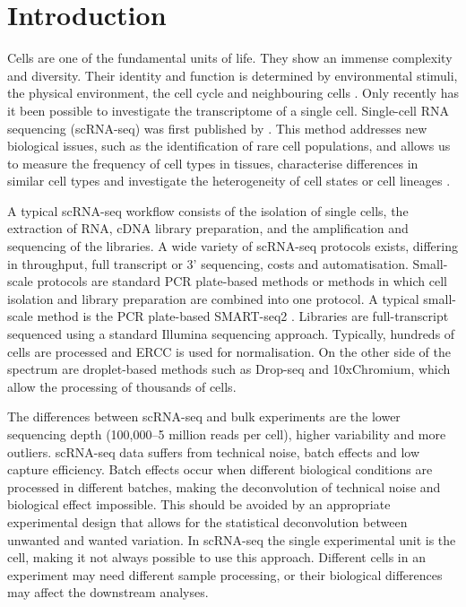 \documentclass[11pt, a4paper]{article}\usepackage[]{graphicx}\usepackage[]{color}
\begin{document}
\tableofcontents
\newpage
\section{Introduction}
Cells are one of the fundamental units of life. They show an immense complexity and diversity. Their identity and function is determined by environmental stimuli, the physical environment, the cell cycle and neighbouring cells \citep{wagner2016revealing}. Only recently has it been possible to investigate the transcriptome of a single cell. Single-cell RNA sequencing (scRNA-seq) was first published by \citet{tang2009mrna}. This method addresses new biological issues, such as the identification of rare cell populations, and allows us to measure the frequency of cell types in tissues, characterise differences in similar cell types and investigate the heterogeneity of cell states or cell lineages \citep{andrews2017identifying}.

A typical scRNA-seq workflow consists of the isolation of single cells, the extraction of RNA, cDNA library preparation, and the amplification and sequencing of the libraries. A wide variety of scRNA-seq protocols exists, differing in throughput, full transcript or 3' sequencing, costs and automatisation. Small-scale protocols are standard PCR plate-based methods or methods in which cell isolation and library preparation are combined into one protocol. A typical small-scale method is the PCR plate-based SMART-seq2 \citep{picelli2013smart}. Libraries are full-transcript sequenced using a standard Illumina sequencing approach. Typically, hundreds of cells are processed and ERCC is used for normalisation. On the other side of the spectrum are droplet-based methods such as Drop-seq and 10xChromium, which allow the processing of thousands of cells.

The differences between scRNA-seq and bulk experiments are the lower sequencing depth (100,000--5 million reads per cell), higher variability and more outliers. scRNA-seq data suffers from technical noise, batch effects and low capture efficiency. Batch effects occur when different biological conditions are processed in different batches, making the deconvolution of technical noise and biological effect impossible. This should be avoided by an appropriate experimental design that allows for the statistical deconvolution between unwanted and wanted variation. In scRNA-seq the single experimental unit is the cell, making it not always possible to use this approach. Different cells in an experiment may need different sample processing, or their biological differences may affect the downstream analyses.
\end{document}
